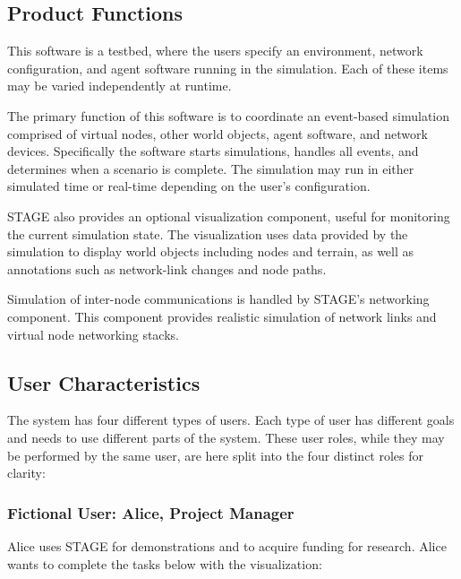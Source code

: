 \documentclass[titlepage]{article}
\begin{document}
\subsection{Product Functions%
  \label{product-functions}%
}

This software is a testbed, where the users specify an environment, network configuration, and agent software running in
the simulation. Each of these items may be varied independently at runtime.

The primary function of this software is to coordinate an event-based simulation comprised of virtual nodes, other world objects,
agent software, and network devices.  Specifically the software starts simulations, handles all events, and determines
when a scenario is complete.  The simulation may run in either simulated time or real-time depending on the user's
configuration.

STAGE also provides an optional visualization component, useful for monitoring the current simulation state.  The
visualization uses data provided by the simulation to display world objects including nodes and terrain, as well as
annotations such as network-link changes and node paths.

Simulation of inter-node communications is handled by STAGE's networking component.  This component provides realistic
simulation of network links and virtual node networking stacks.



\subsection{User Characteristics%
  \label{user-characteristics}%
}

The system has four different types of users.  Each type of user has different goals and needs to use different parts of the system.  These user roles, while they may be performed by the same user, are here split into the four distinct roles for clarity:


\subsubsection{Fictional User: Alice, Project Manager%
  \label{alice}%
}

Alice uses STAGE for demonstrations and to acquire funding for research.  Alice wants to complete the tasks below with
the visualization:
\end{document}
